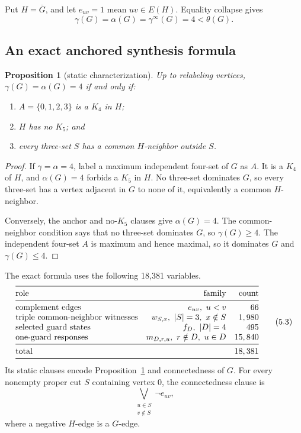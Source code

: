 \documentclass[11pt]{article}
\newtheorem{proposition}[theorem]{Proposition}
\theoremstyle{definition}
\theoremstyle{remark}
\newcommand{\gaminf}{\gamma^{\infty}}
\begin{document}
Put \(H=\overline G\), and let \(e_{uv}=1\) mean \(uv\in E(H)\).
Equality collapse gives
\[
  \gamma(G)=\alpha(G)=\gaminf(G)=4<\theta(G).
\tag{5.2}
\]

\subsection{An exact anchored synthesis formula}

\begin{proposition}[static characterization]\label{prop:k4-static}
Up to relabeling vertices, \(\gamma(G)=\alpha(G)=4\) if and only if:
\begin{enumerate}
\item \(A=\{0,1,2,3\}\) is a \(K_4\) in \(H\);
\item \(H\) has no \(K_5\); and
\item every three-set \(S\) has a common \(H\)-neighbor outside \(S\).
\end{enumerate}
\end{proposition}

\begin{proof}
If \(\gamma=\alpha=4\), label a maximum independent four-set of \(G\) as
\(A\).  It is a \(K_4\) of \(H\), and \(\alpha(G)=4\) forbids a \(K_5\)
in \(H\).  No three-set dominates \(G\), so every three-set has a vertex
adjacent in \(G\) to none of it, equivalently a common \(H\)-neighbor.

Conversely, the anchor and no-\(K_5\) clauses give \(\alpha(G)=4\).
The common-neighbor condition says that no three-set dominates \(G\), so
\(\gamma(G)\geq4\).  The independent four-set \(A\) is maximum and hence
maximal, so it dominates \(G\) and \(\gamma(G)\leq4\).
\end{proof}

The exact formula uses the following 18,381 variables.
\[
\begin{array}{@{}lrr@{}}
\toprule
\text{role} & \text{family} & \text{count}\\
\midrule
\text{complement edges} & e_{uv},\ u<v & 66\\
\text{triple common-neighbor witnesses}
  & w_{S,x},\ |S|=3,\ x\notin S & 1,980\\
\text{selected guard states} & f_D,\ |D|=4 & 495\\
\text{one-guard responses}
  & m_{D,r,u},\ r\notin D,\ u\in D & 15,840\\
\midrule
\text{total}&&18,381\\
\bottomrule
\end{array}
\tag{5.3}
\]
Its static clauses encode Proposition~\ref{prop:k4-static} and
connectedness of \(G\).  For every nonempty proper cut \(S\) containing
vertex \(0\), the connectedness clause is
\[
  \bigvee_{\substack{u\in S\\v\notin S}}\neg e_{uv},
\tag{5.4}
\]
where a negative \(H\)-edge is a \(G\)-edge.
\end{document}
